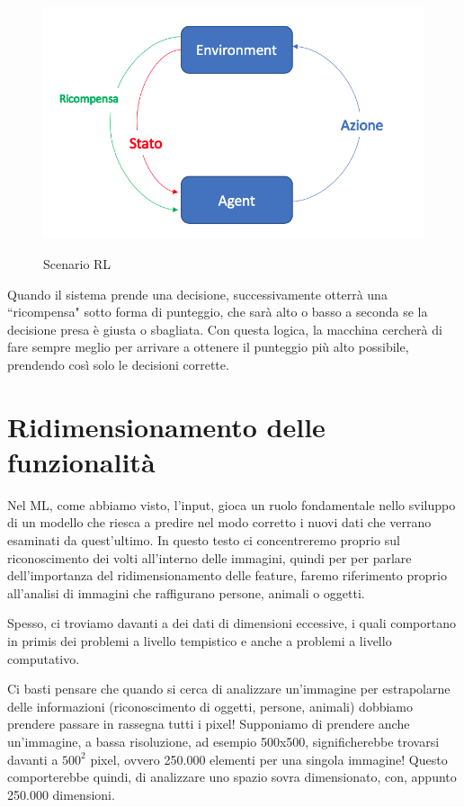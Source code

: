 \documentclass[12pt,italian]{report}
\begin{document}
\begin{figure}[h!]
	\noindent
	\center
	\label{fig:rl_scenario}
	\includegraphics[scale=0.5]{../img/rl_scenario}
	\caption{Scenario RL}
\end{figure}

Quando il sistema prende una decisione, successivamente otterrà una ``ricompensa" sotto forma di punteggio, che sarà alto o basso a seconda se la decisione presa è giusta o sbagliata. Con questa logica, la macchina cercherà di fare sempre meglio per arrivare a ottenere il punteggio più alto possibile, prendendo così solo le decisioni corrette. 

\section{Ridimensionamento delle funzionalità}

Nel ML, come abbiamo visto, l'input, gioca un ruolo fondamentale nello sviluppo di un modello che riesca a predire nel modo corretto i nuovi dati che verrano esaminati da quest'ultimo.
In questo testo ci concentreremo proprio sul riconoscimento dei volti all'interno delle immagini, quindi per per parlare dell'importanza del ridimensionamento delle feature, faremo riferimento proprio all'analisi di immagini che raffigurano persone, animali o oggetti.

Spesso, ci troviamo davanti a dei dati di dimensioni eccessive, i quali comportano in primis dei problemi a livello tempistico e anche a problemi a livello computativo.

Ci basti pensare che quando si cerca di analizzare un'immagine per estrapolarne delle informazioni (riconoscimento di oggetti, persone, animali) dobbiamo prendere passare in rassegna tutti i pixel! Supponiamo di prendere anche un'immagine, a bassa risoluzione, ad esempio 500x500, significherebbe trovarsi davanti a $ 500^2 $ pixel, ovvero 250.000 elementi per una singola immagine! Questo comporterebbe quindi, di analizzare uno spazio sovra dimensionato, con, appunto 250.000 dimensioni.
\end{document}
